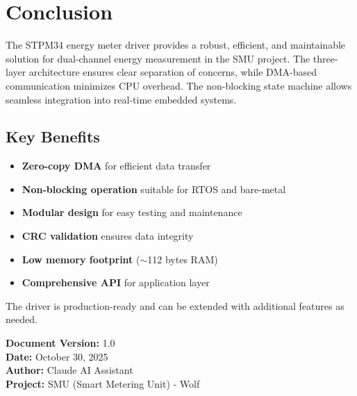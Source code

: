 \documentclass[11pt,a4paper]{article}
\begin{document}
\section{Conclusion}

The STPM34 energy meter driver provides a robust, efficient, and maintainable solution for dual-channel energy measurement in the SMU project. The three-layer architecture ensures clear separation of concerns, while DMA-based communication minimizes CPU overhead. The non-blocking state machine allows seamless integration into real-time embedded systems.

\subsection{Key Benefits}

\begin{itemize}[noitemsep]
    \item \textbf{Zero-copy DMA} for efficient data transfer
    \item \textbf{Non-blocking operation} suitable for RTOS and bare-metal
    \item \textbf{Modular design} for easy testing and maintenance
    \item \textbf{CRC validation} ensures data integrity
    \item \textbf{Low memory footprint} ($\sim$112 bytes RAM)
    \item \textbf{Comprehensive API} for application layer
\end{itemize}

The driver is production-ready and can be extended with additional features as needed.

\vspace{2em}

\noindent
\textbf{Document Version:} 1.0 \\
\textbf{Date:} October 30, 2025 \\
\textbf{Author:} Claude AI Assistant \\
\textbf{Project:} SMU (Smart Metering Unit) - Wolf
\end{document}
